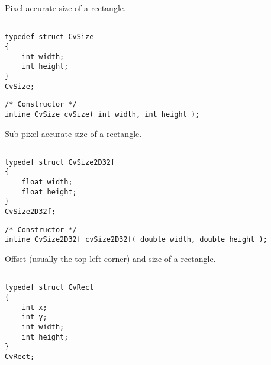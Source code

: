 Pixel-accurate size of a rectangle.

\begin{lstlisting}

typedef struct CvSize
{
    int width; 
    int height; 
}
CvSize;
\end{lstlisting}

\begin{description}
\end{description}

\begin{lstlisting}
/* Constructor */
inline CvSize cvSize( int width, int height );

\end{lstlisting}

\label{CvSize2D32f}

Sub-pixel accurate size of a rectangle.

\begin{lstlisting}

typedef struct CvSize2D32f
{
    float width; 
    float height; 
}
CvSize2D32f;
\end{lstlisting}

\begin{description}
\end{description}

\begin{lstlisting}
/* Constructor */
inline CvSize2D32f cvSize2D32f( double width, double height );

\end{lstlisting}

\label{CvRect}

Offset (usually the top-left corner) and size of a rectangle.

\begin{lstlisting}

typedef struct CvRect
{
    int x; 
    int y; 
    int width; 
    int height; 
}
CvRect;
\end{lstlisting}

\begin{description}
\end{description}

